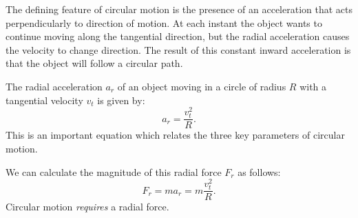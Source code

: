 \documentclass[letterpaper,9pt,journal]{IEEEtran}
\newcommand{\dokuitalic}[1]{\textsl{#1}}
\begin{document}
The defining feature of circular motion is the presence of an acceleration
that acts perpendicularly to direction of motion.
At each instant the object wants to continue moving along the tangential direction,
but the radial acceleration causes the velocity to change direction.
The result of this constant inward acceleration is that the object will
follow a circular path.

The radial acceleration $a_r$ of an object moving in a circle of radius $R$
with a tangential velocity $v_t$ is given by:
\[
  a_r = \frac{v^2_t}{ R }.
\]
This is an important equation which relates the three key parameters of circular motion.

We can calculate the magnitude of this radial force $F_r$ as follows:
\[
  F_{r} = ma_r = m \frac{v^2_t}{ R }.
\]
Circular motion \dokuitalic{requires} a radial force.


%

\end{document}
